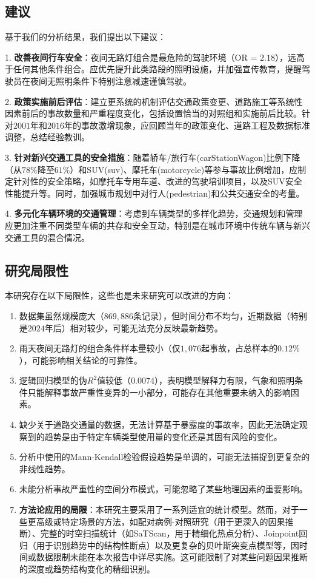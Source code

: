 \documentclass[12pt,a4paper]{article}
\begin{document}
\subsection{建议}

基于我们的分析结果，我们提出以下建议：

1. \textbf{改善夜间行车安全}：夜间无路灯组合是最危险的驾驶环境（OR = $2.18$），远高于任何其他条件组合。应优先提升此类路段的照明设施，并加强宣传教育，提醒驾驶员在夜间无照明条件下特别注意减速谨慎驾驶。

2. \textbf{政策实施前后评估}：建立更系统的机制评估交通政策变更、道路施工等系统性因素前后的事故数量和严重程度变化，包括设置恰当的对照组和实施前后比较。针对$2001$年和$2016$年的事故激增现象，应回顾当年的政策变化、道路工程及数据标准调整，总结经验教训。

3. \textbf{针对新兴交通工具的安全措施}：随着轿车/旅行车(carStationWagon)比例下降（从$78\%$降至$61\%$）和SUV(suv)、摩托车(motorcycle)等参与事故比例增加，应制定针对性的安全策略，如摩托车专用车道、改进的驾驶培训项目，以及SUV安全性能提升等。同时，加强城市规划中对行人(pedestrian)和公共交通安全的考量。

4. \textbf{多元化车辆环境的交通管理}：考虑到车辆类型的多样化趋势，交通规划和管理应更加注重不同类型车辆的共存和安全互动，特别是在城市环境中传统车辆与新兴交通工具的混合情况。

\subsection{研究局限性}

本研究存在以下局限性，这些也是未来研究可以改进的方向：

\begin{enumerate}
\item 数据集虽然规模庞大（$869,886$条记录），但时间分布不均匀，近期数据（特别是$2024$年后）相对较少，可能无法充分反映最新趋势。
\item 雨天夜间无路灯的组合条件样本量较小（仅$1,076$起事故，占总样本的$0.12\%$），可能影响相关结论的可靠性。
\item 逻辑回归模型的伪$R^2$值较低（$0.0074$），表明模型解释力有限，气象和照明条件只能解释事故严重性变异的一小部分，可能存在其他重要未纳入的影响因素。
\item 缺少关于道路交通量的数据，无法计算基于暴露度的事故率，因此无法确定观察到的趋势是由于特定车辆类型使用量的变化还是其固有风险的变化。
\item 分析中使用的Mann-Kendall检验假设趋势是单调的，可能无法捕捉到更复杂的非线性趋势。
\item 未能分析事故严重性的空间分布模式，可能忽略了某些地理因素的重要影响。
\item \textbf{方法论应用的局限}：本研究主要采用了一系列适宜的统计模型。然而，对于一些更高级或特定场景的方法，如配对病例-对照研究（用于更深入的因果推断）、完整的时空扫描统计（如SaTScan，用于精细化热点分析）、Joinpoint回归（用于识别趋势中的结构性断点）以及更复杂的贝叶斯突变点模型等，因时间或数据限制未能在本次报告中详尽实施。这可能限制了对某些问题因果推断的深度或趋势结构变化的精细识别。
\end{enumerate}
\end{document}
